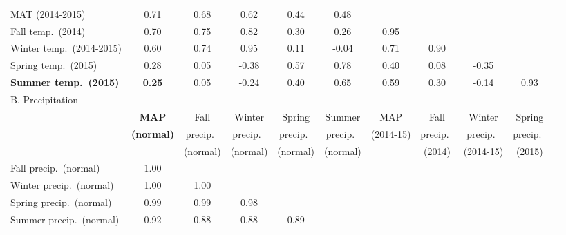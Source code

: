 \documentclass{article}
\begin{document}
{{{{{\begin{landscape}
\begin{longtable}[p]{lcccccccccc}
MAT (2014-2015)          & 0.71     & 0.68       & 0.62         & 0.44         & 0.48         &             &            &              &              & \\
Fall temp.\ (2014)        & 0.70     & 0.75       & 0.82         & 0.30         & 0.26         & 0.95        &            &              &              & \\
Winter temp.\ (2014-2015) & 0.60     & 0.74       & 0.95         & 0.11         & -0.04        & 0.71        & 0.90       &              &              & \\
Spring temp.\ (2015)      & 0.28     & 0.05       & -0.38        & 0.57         & 0.78         & 0.40        & 0.08       & -0.35        &              & \\
\textbf{Summer temp.\ (2015)}      & \textbf{0.25}     & 0.05       & -0.24        & 0.40         & 0.65         & 0.59        & 0.30       & -0.14        & 0.93         & \\
\midrule
B. Precipitation            &          &              &                &                &                &             &              &                &                & \\
\midrule
                            & \textbf{MAP}      & Fall  & Winter  & Spring  & Summer  & MAP         & Fall & Winter & Spring & \\
                            & \textbf{(normal)}     & precip.\ & precip.\ & precip.\ & precip.\ & (2014-15)         & precip.\ & precip.\ & precip.\ & \\
                            &  & (normal)     & (normal)       & (normal)       & (normal)       &  & (2014)       & (2014-15)    & (2015)         \\
Fall  precip.\ (normal)     & 1.00     &              &                &                &                &             &              &                &                & \\
Winter precip.\ (normal)    & 1.00     & 1.00         &                &                &                &             &              &                &                & \\
Spring precip.\ (normal)    & 0.99     & 0.99         & 0.98           &                &                &             &              &                &                & \\
Summer precip.\ (normal)    & 0.92     & 0.88         & 0.88           & 0.89           &                &             &              &                &                & \\

\end{longtable}
\end{landscape}}}}}}
\end{document}
